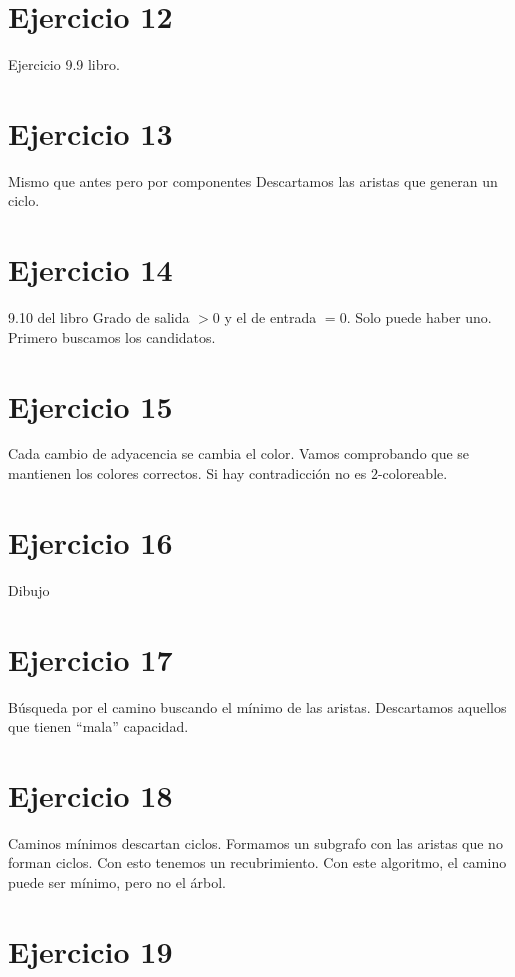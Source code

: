 \documentclass[10pt,a4paper,openright]{book}
\theoremstyle{break}
\begin{document}
\section{Ejercicio 12}%
\label{sec:ejercicio_12_4}
Ejercicio 9.9 libro.

\section{Ejercicio 13}%
\label{sec:ejercicio_13_4}
Mismo que antes pero por componentes
Descartamos las aristas que generan un ciclo. 

\section{Ejercicio 14}%
\label{sec:ejercicio_14_4}
9.10 del libro
Grado de salida $> 0$ y el de entrada $= 0$. Solo puede haber uno. 
Primero buscamos los candidatos.

\section{Ejercicio 15}%
\label{sec:ejercicio_15_4}
Cada cambio de adyacencia se cambia el color. Vamos comprobando que se mantienen los colores correctos. Si hay contradicción no es $2$-coloreable.

\section{Ejercicio 16}%
\label{sec:ejercicio_16_4}
Dibujo

\section{Ejercicio 17}%
\label{sec:ejercicio_17_4}
Búsqueda por el camino buscando el mínimo de las aristas. Descartamos aquellos que tienen ``mala'' capacidad.

\section{Ejercicio 18}%
\label{sec:ejercicio_18_4}
Caminos mínimos descartan ciclos. Formamos un subgrafo con las aristas que no forman ciclos. Con esto tenemos un recubrimiento. Con este algoritmo, el camino puede ser mínimo, pero no el árbol.

\section{Ejercicio 19}%
\label{sec:ejercicio_19_4}
\end{document}
